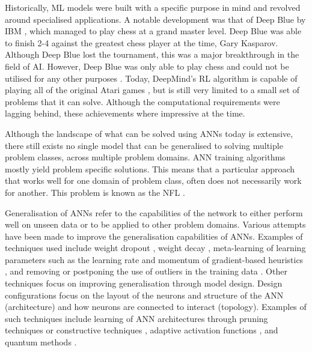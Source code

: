 Historically, \ac{ML} models were built with a specific purpose in mind and revolved around specialised applications. A notable development was that of Deep Blue by IBM \cite{ref:keene:1996}, which managed to play chess at a grand master level. Deep Blue was able to finish 2-4 against the greatest chess player at the time, Gary Kasparov. Although Deep Blue lost the tournament, this was a major breakthrough in the field of \ac{AI}. However, Deep Blue was only able to play chess and could not be utilised for any other purposes \cite{ref:kelley:2010}. Today, DeepMind's \ac{RL} algorithm is capable of playing all of the original Atari games \cite{ref:mnih:2013}, but is still very limited to a small set of problems that it can solve. Although the computational requirements were lagging behind, these achievements where impressive at the time.

Although the landscape of what can be solved using \acp{ANN} today is extensive, there still exists no single model that can be generalised to solving multiple problem classes, across multiple problem domains. \acs{ANN} training algorithms mostly yield problem specific solutions. This means that a particular approach that works well for one domain of problem class, often does not necessarily work for another. This problem is known as the \ac{NFL} \cite{ref:wolpert:1997}.

Generalisation of \acp{ANN} refer to the capabilities of the network to either perform well on unseen data or to be applied to other problem domains. Various attempts have been made to improve the generalisation capabilities of \acp{ANN}. Examples of techniques used include weight dropout \cite{ref:srivastava:2014}, weight decay \cite{ref:krogh:1992}, meta-learning of learning parameters such as the learning rate and momentum of gradient-based heuristics \cite{ref:zeiler:2012, ref:lv:2017, ref:darken:1992}, and removing or postponing the use of outliers in the training data \cite{ref:reeves:1998}. Other techniques focus on improving generalisation through model design. Design configurations focus on the layout of the neurons and structure of the \acs{ANN} (architecture) and how neurons are connected to interact (topology). Examples of such techniques include learning of \ac{ANN} architectures through pruning techniques \cite{ref:cibas:1996, ref:engelbrecht:1996} or constructive techniques \cite{ref:hassibi:1994, ref:lecun:1990}, adaptive activation functions \cite{ref:engelbrecht:1995, ref:fletcher:1994}, and quantum methods \cite{ref:wan:2017, ref:ricks:2004}.

